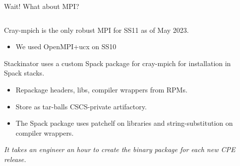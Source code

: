 \documentclass[aspectratio=43]{beamer}
\begin{document}
\begin{frame}[fragile]{Wait! What about MPI?}
    \begin{columns}[T]
        \begin{column}{0.65\textwidth}
            Cray-mpich is the only robust MPI for SS11 as of May 2023.
            \begin{itemize}
                \item We used OpenMPI+ucx on SS10
            \end{itemize}

            \vspace{10pt}

            Stackinator uses a custom Spack package for cray-mpich for installation in Spack stacks.
            \begin{itemize}
                \item Repackage headers, libs, compiler wrappers from RPMs.
                \item Store as tar-balls CSCS-private artifactory.
                \item The Spack package uses patchelf on libraries and string-substitution on compiler wrappers.
            \end{itemize}
            \emph{It takes an engineer an hour to create the binary package for each new CPE release.}
        \end{column}
        \hspace{-40pt}
        \begin{column}{0.4\textwidth}
            {
            \setlength{\DTbaselineskip}{5pt}
            \footnotesize
            
            }
        \end{column}
    \end{columns}

\end{frame}
\end{document}
